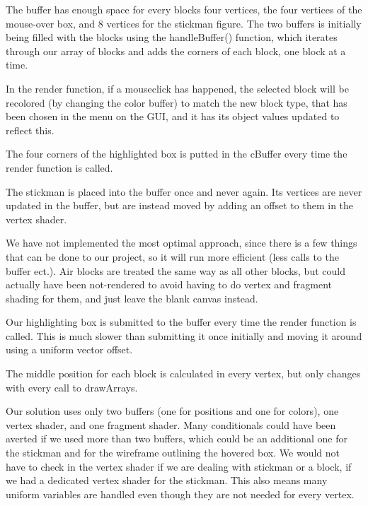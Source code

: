 
The buffer has enough space for every blocks four vertices, the four vertices of the mouse-over box, and 8 vertices for the stickman figure.
The two buffers is initially being filled with the blocks using the handleBuffer() function, which iterates through our array of blocks and adds the corners of each block, one block at a time.

In the render function, if a mouseclick has happened, 
the selected block will be recolored (by changing the color buffer) to match the new block type, that has been chosen in the menu on the GUI, and it has its object values updated to reflect this.

The four corners of the highlighted box is putted in the cBuffer every time the render function is called.

The stickman is placed into the buffer once and never again. Its vertices are never updated in the buffer, but are instead moved by adding an offset to them in the vertex shader.




We have not implemented the most optimal approach, since there is a few things that can be done to our project, so it will run more efficient (less calls to the buffer ect.).
Air blocks are treated the same way as all other blocks, 
but could actually have been not-rendered to avoid having to do vertex and fragment shading for them, and just leave the blank canvas instead.

Our highlighting box is submitted to the buffer every time the render function is called. 
This is much slower than submitting it once initially and moving it around using a uniform vector offset.

The middle position for each block is calculated in every vertex, but only changes with every call to drawArrays.

Our solution uses only two buffers (one for positions and one for colors), one vertex shader, and one fragment shader. 
Many conditionals could have been averted if we used more than two buffers, which could be an additional one for the stickman and for the wireframe outlining the hovered box. 
We would not have to check in the vertex shader if we are dealing with stickman or a block, if we had a dedicated vertex shader for the stickman.
This also means many uniform variables are handled even though they are not needed for every vertex.


